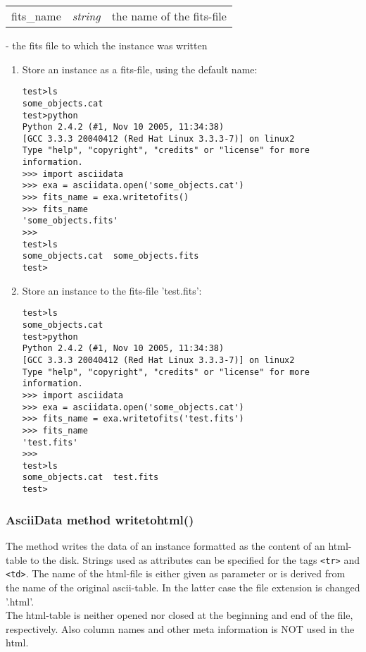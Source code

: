 \begin{tabular}{lcl}
fits\_name & {\it string} & the name of the fits-file\\
\end{tabular}

- the fits file to which the \ad instance was written

\begin{enumerate}
\item Store an \ad instance as a fits-file, using the default name:
\begin{small}
\begin{verbatim}
test>ls
some_objects.cat
test>python
Python 2.4.2 (#1, Nov 10 2005, 11:34:38)
[GCC 3.3.3 20040412 (Red Hat Linux 3.3.3-7)] on linux2
Type "help", "copyright", "credits" or "license" for more information.
>>> import asciidata
>>> exa = asciidata.open('some_objects.cat')
>>> fits_name = exa.writetofits()
>>> fits_name
'some_objects.fits'
>>>
test>ls
some_objects.cat  some_objects.fits
test>
\end{verbatim}
\end{small}


\item Store an \ad instance to the fits-file 'test.fits':
\begin{small}
\begin{verbatim}
test>ls
some_objects.cat
test>python
Python 2.4.2 (#1, Nov 10 2005, 11:34:38)
[GCC 3.3.3 20040412 (Red Hat Linux 3.3.3-7)] on linux2
Type "help", "copyright", "credits" or "license" for more information.
>>> import asciidata
>>> exa = asciidata.open('some_objects.cat')
>>> fits_name = exa.writetofits('test.fits')
>>> fits_name
'test.fits'
>>>
test>ls
some_objects.cat  test.fits
test>
\end{verbatim}
\end{small}
\end{enumerate}


\subsubsection{AsciiData method writetohtml()}
\label{adm_writetohtml}
%
The method writes the data of an \ad instance formatted as the content of
an html-table to the disk. Strings used as attributes can be specified
for the tags {\tt<tr>} and {\tt <td>}. The name of the html-file is either
given as parameter or is derived from the name of the original ascii-table.
In the latter case the file extension is changed '.html'.\\
The html-table is neither opened nor closed at
the beginning and end of the file, respectively. Also column names and
other meta information is NOT used in the html.


